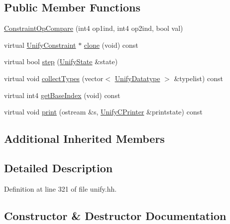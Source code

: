 \subsection*{Public Member Functions}
\begin{DoxyCompactItemize}
\item 
\mbox{\hyperlink{class_constraint_op_compare_a8cf67d67a93504713c5ad842adfb7b3d}{Constraint\+Op\+Compare}} (int4 op1ind, int4 op2ind, bool val)
\item 
virtual \mbox{\hyperlink{class_unify_constraint}{Unify\+Constraint}} $\ast$ \mbox{\hyperlink{class_constraint_op_compare_ae99b6c25cca1f8587d661847e474e062}{clone}} (void) const
\item 
virtual bool \mbox{\hyperlink{class_constraint_op_compare_ad3e51a4ae74aa157e112f2aa85f23781}{step}} (\mbox{\hyperlink{class_unify_state}{Unify\+State}} \&state)
\item 
virtual void \mbox{\hyperlink{class_constraint_op_compare_a7cbcbc4c56d6b125f96be567421b6b94}{collect\+Types}} (vector$<$ \mbox{\hyperlink{class_unify_datatype}{Unify\+Datatype}} $>$ \&typelist) const
\item 
virtual int4 \mbox{\hyperlink{class_constraint_op_compare_a24207ae4f857cc4e1d6bec892c13a04e}{get\+Base\+Index}} (void) const
\item 
virtual void \mbox{\hyperlink{class_constraint_op_compare_af654630346b3640959fb4504573a6466}{print}} (ostream \&s, \mbox{\hyperlink{class_unify_c_printer}{Unify\+C\+Printer}} \&printstate) const
\end{DoxyCompactItemize}
\subsection*{Additional Inherited Members}


\subsection{Detailed Description}


Definition at line 321 of file unify.\+hh.



\subsection{Constructor \& Destructor Documentation}
\mbox{\label{class_constraint_op_compare_a8cf67d67a93504713c5ad842adfb7b3d}} 

